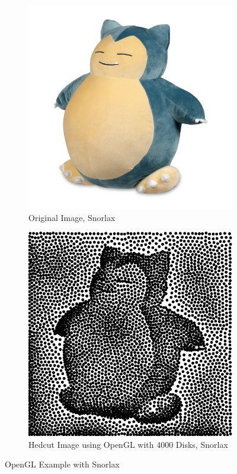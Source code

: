 \documentclass[11pt]{article}
\begin{document}
\begin{figure}[H]
	\centering
	\begin{subfigure}[b]{.48\linewidth}
	 	\includegraphics[width=\linewidth]{Snorlax}
	 	\caption{Original Image, Snorlax}
	 	\label{fig:snorlax}
	\end{subfigure}
	\begin{subfigure}[b]{.48\linewidth}
		\includegraphics[width=\linewidth]{Snorlax-OpenGL-4000}
		\caption{Hedcut Image using OpenGL with 4000 Disks, Snorlax}
		\label{fig:snorlaxOpenGL}
	\end{subfigure}
	\caption{OpenGL Example with Snorlax}
	\label{fig:snorlaxExample}
\end{figure}
\end{document}
